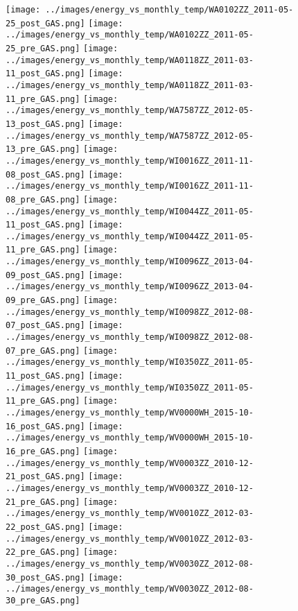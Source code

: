 \clearpage
\begin{figure}
\centering
\texttt{[image: ../images/energy\_vs\_monthly\_temp/WA0102ZZ\_2011-05-25\_post\_GAS.png]}
\texttt{[image: ../images/energy\_vs\_monthly\_temp/WA0102ZZ\_2011-05-25\_pre\_GAS.png]}
\texttt{[image: ../images/energy\_vs\_monthly\_temp/WA0118ZZ\_2011-03-11\_post\_GAS.png]}
\texttt{[image: ../images/energy\_vs\_monthly\_temp/WA0118ZZ\_2011-03-11\_pre\_GAS.png]}
\texttt{[image: ../images/energy\_vs\_monthly\_temp/WA7587ZZ\_2012-05-13\_post\_GAS.png]}
\texttt{[image: ../images/energy\_vs\_monthly\_temp/WA7587ZZ\_2012-05-13\_pre\_GAS.png]}
\texttt{[image: ../images/energy\_vs\_monthly\_temp/WI0016ZZ\_2011-11-08\_post\_GAS.png]}
\texttt{[image: ../images/energy\_vs\_monthly\_temp/WI0016ZZ\_2011-11-08\_pre\_GAS.png]}
\texttt{[image: ../images/energy\_vs\_monthly\_temp/WI0044ZZ\_2011-05-11\_post\_GAS.png]}
\texttt{[image: ../images/energy\_vs\_monthly\_temp/WI0044ZZ\_2011-05-11\_pre\_GAS.png]}
\texttt{[image: ../images/energy\_vs\_monthly\_temp/WI0096ZZ\_2013-04-09\_post\_GAS.png]}
\texttt{[image: ../images/energy\_vs\_monthly\_temp/WI0096ZZ\_2013-04-09\_pre\_GAS.png]}
\texttt{[image: ../images/energy\_vs\_monthly\_temp/WI0098ZZ\_2012-08-07\_post\_GAS.png]}
\texttt{[image: ../images/energy\_vs\_monthly\_temp/WI0098ZZ\_2012-08-07\_pre\_GAS.png]}
\texttt{[image: ../images/energy\_vs\_monthly\_temp/WI0350ZZ\_2011-05-11\_post\_GAS.png]}
\texttt{[image: ../images/energy\_vs\_monthly\_temp/WI0350ZZ\_2011-05-11\_pre\_GAS.png]}
\texttt{[image: ../images/energy\_vs\_monthly\_temp/WV0000WH\_2015-10-16\_post\_GAS.png]}
\texttt{[image: ../images/energy\_vs\_monthly\_temp/WV0000WH\_2015-10-16\_pre\_GAS.png]}
\texttt{[image: ../images/energy\_vs\_monthly\_temp/WV0003ZZ\_2010-12-21\_post\_GAS.png]}
\texttt{[image: ../images/energy\_vs\_monthly\_temp/WV0003ZZ\_2010-12-21\_pre\_GAS.png]}
\texttt{[image: ../images/energy\_vs\_monthly\_temp/WV0010ZZ\_2012-03-22\_post\_GAS.png]}
\texttt{[image: ../images/energy\_vs\_monthly\_temp/WV0010ZZ\_2012-03-22\_pre\_GAS.png]}
\texttt{[image: ../images/energy\_vs\_monthly\_temp/WV0030ZZ\_2012-08-30\_post\_GAS.png]}
\texttt{[image: ../images/energy\_vs\_monthly\_temp/WV0030ZZ\_2012-08-30\_pre\_GAS.png]}
\end{figure}

